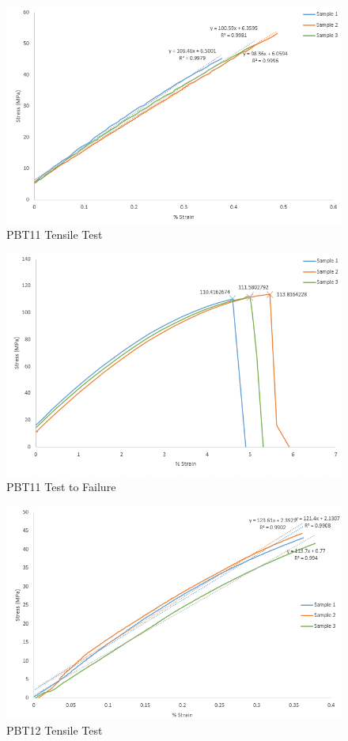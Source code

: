 \documentclass[11pt]{article}
\begin{document}
\begin{figure}[H]
\centering
\includegraphics[width=.95\linewidth]{figures/PBT11_Tensile.png}
\caption{PBT11 Tensile Test}
\label{pbt11tensile}
\end{figure}

\begin{figure}[H]
\centering
\includegraphics[width=.95\linewidth]{figures/PBT11_Fail.png}
\caption{PBT11 Test to Failure}
\label{pbt11fail}
\end{figure}

\begin{figure}[H]
\centering
\includegraphics[width=.95\linewidth]{figures/PBT12_Tensile.png}
\caption{PBT12 Tensile Test}
\label{pbt12tensile}
\end{figure}
\end{document}
